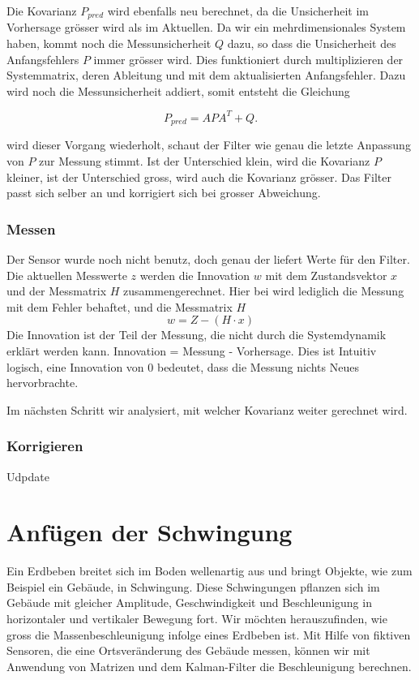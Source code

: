 \documentclass[11pt,a4paper]{article}
\begin{document}
Die Kovarianz $P_{pred}$ wird ebenfalls neu berechnet, da die Unsicherheit im Vorhersage grösser wird als im Aktuellen. Da wir ein mehrdimensionales System haben, kommt noch die Messunsicherheit $Q$ dazu, so dass die Unsicherheit des Anfangsfehlers $P$ immer grösser wird. Dies funktioniert durch multiplizieren der Systemmatrix, deren Ableitung und mit dem aktualisierten Anfangsfehler. Dazu wird noch die Messunsicherheit addiert, somit entsteht die Gleichung

\begin{equation}
{P_{pred}}=APA^T+Q.
\end{equation}

wird dieser Vorgang wiederholt, schaut der Filter wie genau die letzte Anpassung von $P$ zur Messung stimmt. Ist der Unterschied klein, wird die Kovarianz $P$ kleiner, ist der Unterschied gross, wird auch die Kovarianz grösser. Das Filter passt sich selber an und korrigiert sich bei grosser Abweichung.

\subsubsection*{Messen}
Der Sensor wurde noch nicht benutz, doch genau der liefert Werte für den Filter. Die aktuellen Messwerte $z$ werden die Innovation $w$ mit dem Zustandsvektor $x$ und der Messmatrix $H$ zusammengerechnet.
Hier bei wird lediglich die Messung mit dem Fehler behaftet, und die Messmatrix $H$ 
\begin{equation}
w=Z-(H\cdot x)
\end{equation}
Die Innovation ist der Teil der Messung, die nicht durch die Systemdynamik erklärt werden kann. 
Innovation = Messung - Vorhersage. Dies ist Intuitiv logisch, eine Innovation von 0 bedeutet, dass die Messung nichts Neues hervorbrachte.

Im nächsten Schritt wir analysiert, mit welcher Kovarianz weiter gerechnet wird. 

\subsubsection*{Korrigieren}
Udpdate
\section{Anfügen der Schwingung}

Ein Erdbeben breitet sich im Boden wellenartig aus und bringt Objekte, wie zum Beispiel ein Gebäude, in Schwingung.
Diese Schwingungen pflanzen sich im Gebäude mit gleicher Amplitude, Geschwindigkeit und Beschleunigung in horizontaler und vertikaler Bewegung fort.
Wir möchten herauszufinden, wie gross die Massenbeschleunigung infolge eines Erdbeben ist.
Mit Hilfe von fiktiven Sensoren, die eine Ortsveränderung des Gebäude messen, können wir mit Anwendung von Matrizen und dem Kalman-Filter die Beschleunigung berechnen.
\end{document}
